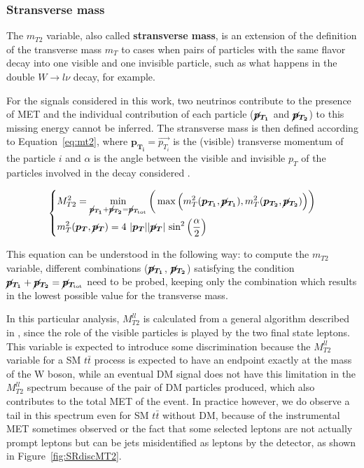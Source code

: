 \documentclass[a4paper, 10pt, openright]{report}
\begin{document}
\subsubsection*{Stransverse mass}

The $m_{T2}$ variable, also called \textbf{stransverse mass}, is an extension of the definition of the transverse mass $m_T$ to cases when pairs of particles with the same flavor decay into one visible and one invisible particle, such as what happens in the double $W \rightarrow l\nu$ decay, for example. 

For the signals considered in this work, two neutrinos contribute to the presence of \ac{MET} and the individual contribution of each particle ($\bm{\cancel{p}_{T_{1}}}$ and $\bm{\cancel{p}_{T_2}}$) to this missing energy cannot be inferred. The stransverse mass is then defined according to Equation~\ref{eq:mt2}, where $\bm{p_{T_i}} = \overrightarrow{p_{T_i}}$ is the (visible) transverse momentum of the particle $i$ and $\alpha$ is the angle between the visible and invisible $p_T$ of the particles involved in the decay considered \cite{MT2}.

\begin{equation}
\label{eq:mt2}
\begin{dcases}
M_{T2}^2 = \min_{\bm{\cancel{p}_{T_{1}}} + \bm{\cancel{p}_{T_{2}}} = \bm{\cancel{p}_{T_{\text{tot}}}}} \bigg (\max \Big (m_T^2(\bm{p_{T_1}}, \bm{\cancel{p}_{T_{1}}}), m_T^2(\bm{p_{T_2}}, \bm{\cancel{p}_{T_{2}}}) \Big ) \bigg ) \\
m_T^2(\bm{p_{T}}, \bm{\cancel{p}_{T}}) = 4 \text{ } |\bm{p_{T}}| |\bm{\cancel{p}_{T}}| \text{ sin}^2 \left (\frac{\alpha}{2} \right ) 
\end{dcases}
\end{equation}

This equation can be understood in the following way: to compute the $m_{T2}$ variable, different combinations ($\bm{\cancel{p}_{T_{1}}}$, $\bm{\cancel{p}_{T_{2}}}$) satisfying the condition $\bm{\cancel{p}_{T_{1}}} + \bm{\cancel{p}_{T_{2}}} = \bm{\cancel{p}_{T_{\text{tot}}}}$ need to be probed, keeping only the combination which results in the lowest possible value for the transverse mass.

In this particular analysis, $M_{T2}^{ll}$ is calculated from a general algorithm described in \cite{MT2Calc}, since the role of the visible particles is played by the two final state leptons. This variable is expected to introduce some discrimination because the $M_{T2}^{ll}$ variable for a \ac{SM} $t \bar t$ process is expected to have an endpoint exactly at the mass of the W boson, while an eventual \ac{DM} signal does not have this limitation in the $M_{T2}^{ll}$ spectrum because of the pair of \ac{DM} particles produced, which also contributes to the total \ac{MET} of the event. In practice however, we do observe a tail in this spectrum even for \ac{SM} $t \bar t$ without \ac{DM}, because of the instrumental \ac{MET} sometimes observed or the fact that some selected leptons are not actually prompt leptons but can be jets misidentified as leptons by the detector, as shown in Figure~\ref{fig:SRdiscMT2}.
\end{document}
